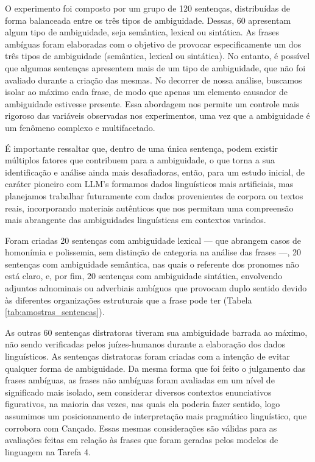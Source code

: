 O experimento foi composto por um grupo de 120 sentenças, distribuídas de forma balanceada entre os três tipos de ambiguidade. Dessas, 60 apresentam algum tipo de ambiguidade, seja semântica, lexical ou sintática. As frases ambíguas foram elaboradas com o objetivo de provocar especificamente um dos três tipos de ambiguidade (semântica, lexical ou sintática). No entanto, é possível que algumas sentenças apresentem mais de um tipo de ambiguidade, que não foi avaliado durante a criação das mesmas. No decorrer de nossa análise, buscamos isolar ao máximo cada frase, de modo que apenas um elemento causador de ambiguidade estivesse presente. Essa abordagem nos permite um controle mais rigoroso das variáveis observadas nos experimentos, uma vez que a ambiguidade é um fenômeno complexo e multifacetado.

É importante ressaltar que, dentro de uma única sentença, podem existir múltiplos fatores que contribuem para a ambiguidade, o que torna a sua identificação e análise ainda mais desafiadoras, então, para um estudo inicial, de caráter pioneiro com LLM's formamos dados linguísticos mais artificiais, mas planejamos trabalhar futuramente com dados provenientes de corpora ou textos reais, incorporando materiais autênticos que nos permitam uma compreensão mais abrangente das ambiguidades linguísticas em contextos variados.

Foram criadas 20 sentenças com ambiguidade lexical — que abrangem casos de homonímia e polissemia, sem distinção de categoria na análise das frases —, 20 sentenças com ambiguidade semântica, nas quais o referente dos pronomes não está claro, e, por fim, 20 sentenças com ambiguidade sintática, envolvendo adjuntos adnominais ou adverbiais ambíguos que provocam duplo sentido devido às diferentes organizações estruturais que a frase pode ter (Tabela \ref{tab:amostras_sentencas}).

As outras 60 sentenças distratoras tiveram sua ambiguidade barrada ao máximo, não sendo verificadas pelos juízes-humanos durante a elaboração dos dados linguísticos. As sentenças distratoras foram criadas com a intenção de evitar qualquer forma de ambiguidade. Da mesma forma que foi feito o julgamento das frases ambíguas, as frases não ambíguas foram avaliadas em um nível de significado mais isolado, sem considerar diversos contextos enunciativos figurativos, na maioria das vezes, nas quais ela poderia fazer sentido, logo assumimos um posicionamento de interpretação mais pragmático linguístico, que corrobora com Cançado. Essas mesmas considerações são válidas para as avaliações feitas em relação às frases que foram geradas pelos modelos de linguagem na Tarefa 4.

